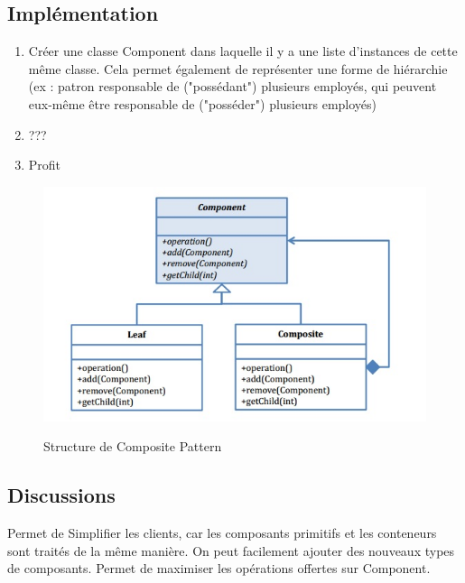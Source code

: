 \subsection{Implémentation}
\begin{enumerate}
    \item Créer une classe Component dans laquelle il y a une liste d’instances de cette même classe. Cela permet également de représenter une forme de hiérarchie (ex : patron responsable de ("possédant") plusieurs employés, qui peuvent eux-même être responsable de ("posséder") plusieurs employés)
    \item ???
    \item Profit
\end{enumerate}

\begin{figure}[H]
	\centering
	\begin{minipage}[t]{8.0cm}
		\includegraphics[scale=0.57]{Images/comp.jpg}
		\label{s1}
   		\caption{Structure de Composite Pattern}
	\end{minipage}
	
\end{figure}


\subsection{Discussions}
Permet de Simplifier les clients, car les composants primitifs et les conteneurs sont traités de la même manière.
On peut facilement ajouter des nouveaux types de composants.
Permet de maximiser les opérations offertes sur Component.










